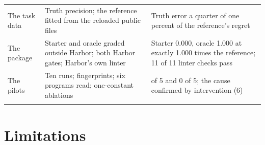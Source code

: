 \documentclass[11pt,letterpaper]{article}
\begin{document}
\begin{small}
\begin{longtable}{>{\raggedright\arraybackslash}p{}>{\raggedright\arraybackslash}p{}>{\raggedright\arraybackslash}p{}}
The task data & Truth precision; the reference fitted from the reloaded public files & Truth error a quarter of one percent of the reference's regret \\ \addlinespace[2pt]
The package & Starter and oracle graded outside Harbor; both Harbor gates; Harbor's own linter & Starter 0.000, oracle 1.000 at exactly 1.000 times the reference; 11 of 11 linter checks pass \\ \addlinespace[2pt]
The pilots & Ten runs; fingerprints; six programs read; one-constant ablations & 0 of 5 and 0 of 5; the cause confirmed by intervention (6) \\ \addlinespace[2pt]
\end{longtable}
\end{small}

\section{Limitations}
\end{document}
